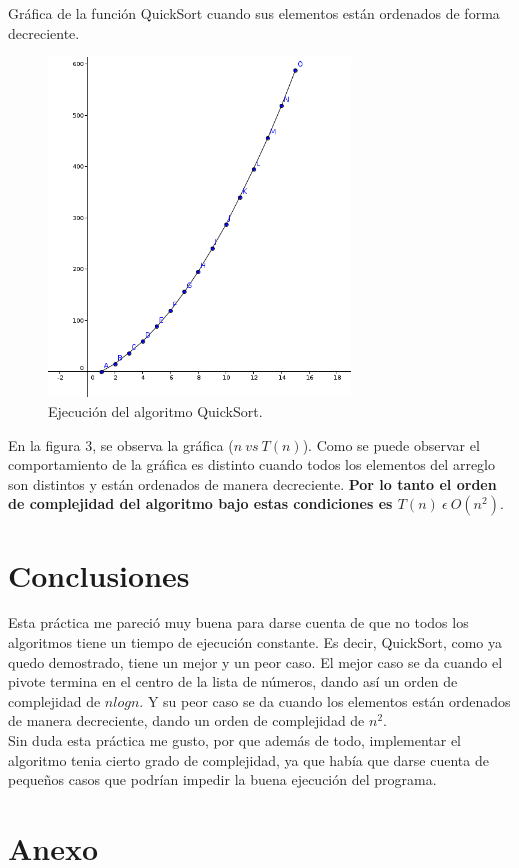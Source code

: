\documentclass[12pt]{report}
\begin{document}
	Gráfica de la función QuickSort cuando sus elementos están ordenados de forma decreciente.\\
	\begin{figure}[H]
		\includegraphics[height=9cm]{imagenes/3.png}
		\centering
		\caption{Ejecución del algoritmo QuickSort.}
		\centering
	\end{figure}
	En la figura 3, se observa la gráfica ($n \ vs \ T(n)$). Como se puede observar el comportamiento de la gráfica es distinto cuando todos los elementos del arreglo son distintos y están ordenados de manera decreciente. \textbf{Por lo tanto el orden de complejidad del algoritmo bajo estas condiciones es $T(n) \ \epsilon \ O(n^{2})$}.\newpage
	
\section{Conclusiones}
Esta práctica me pareció muy buena para darse cuenta de que no todos los algoritmos tiene un tiempo de ejecución constante. Es decir, QuickSort, como ya quedo demostrado, tiene un mejor y un peor caso. El mejor caso se da cuando el pivote termina en el centro de la lista de números, dando así un orden de complejidad de $nlogn$. Y su peor caso se da cuando los elementos están ordenados de manera decreciente, dando un orden de complejidad de $n^{2}$.\\
Sin duda esta práctica me gusto, por que además de todo, implementar el algoritmo tenia cierto grado de complejidad, ya que había que darse cuenta de pequeños casos que podrían impedir la buena ejecución del programa.\newpage 
	

\section{Anexo}
\end{document}
